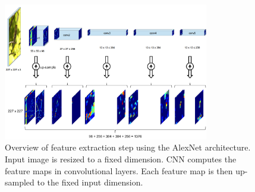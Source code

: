 \documentclass[10pt,twocolumn,letterpaper]{article}
\begin{document}
\begin{figure}
   \centering
   \includegraphics[height=6cm]{images/deeprf}
   \caption{Overview of feature extraction step using the AlexNet \cite{alexnet} architecture. Input image is resized to a fixed dimension. CNN computes the feature maps in convolutional layers. Each feature map is then up-sampled to the fixed input dimension.}
   \label{fig:method}
\end{figure}
\end{document}
